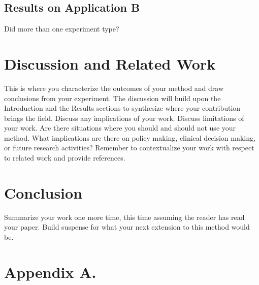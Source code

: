 \documentclass[twoside,11pt]{article}
\begin{document}

\subsection{Results on Application B}

Did more than one experiment type?

\section{Discussion and Related Work}

This is where you characterize the outcomes of your method and draw conclusions from your experiment.
The discussion will build upon the Introduction and the Results sections to synthesize where your contribution brings the field. Discuss any implications of your work.
Discuss limitations of your work.
Are there situations where you should and should not use your method.
What implications are there on policy making, clinical decision making, or future research activities?
Remember to contextualize your work with respect to related work and provide references.

\section{Conclusion}
Summarize your work one more time, this time assuming the reader has read your paper.
Build suspense for what your next extension to this method would be.




\appendix
\section*{Appendix A.}\label{append}
\end{document}
